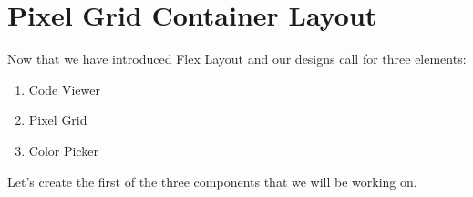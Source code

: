 \maketitle{}
\section{ Pixel Grid Container Layout }

Now that we have introduced Flex Layout and our designs call for three elements:
\begin{enumerate}
  \item Code Viewer
  \item Pixel Grid
  \item Color Picker
\end{enumerate}

Let's create the first of the three components that we will be working on. 
